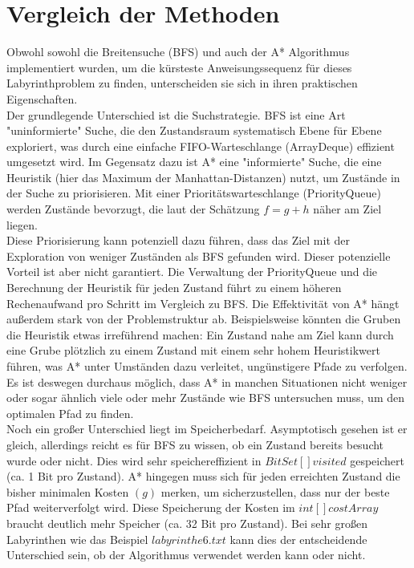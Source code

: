 \documentclass[a4paper,10pt,ngerman]{scrartcl}
\begin{document}
\section{Vergleich der Methoden}
Obwohl sowohl die Breitensuche (BFS) und auch der A* Algorithmus implementiert wurden, um die kürsteste Anweisungssequenz für dieses Labyrinthproblem zu finden, unterscheiden sie sich in ihren praktischen Eigenschaften.\\
Der grundlegende Unterschied ist die Suchstrategie. BFS ist eine Art "uninformierte" Suche, die den Zustandsraum systematisch Ebene für Ebene exploriert, was durch eine einfache FIFO-Warteschlange (ArrayDeque) effizient umgesetzt wird. Im Gegensatz dazu ist A* eine "informierte" Suche, die eine Heuristik (hier das Maximum der Manhattan-Distanzen) nutzt, um Zustände in der Suche zu priorisieren. Mit einer Prioritätswarteschlange (PriorityQueue) werden Zustände bevorzugt, die laut der Schätzung $f = g + h$ näher am Ziel liegen. \\
Diese Priorisierung kann potenziell dazu führen, dass das Ziel mit der Exploration von weniger Zuständen als BFS gefunden wird. Dieser potenzielle Vorteil ist aber nicht garantiert. Die Verwaltung der Priority\-Queue und die Berechnung der Heuristik für jeden Zustand führt zu einem höheren Rechenaufwand pro Schritt im Vergleich zu BFS. Die Effektivität von A* hängt außerdem stark von der Problemstruktur ab. Beispielsweise könnten die Gruben die Heuristik etwas irreführend machen: Ein Zustand nahe am Ziel kann durch eine Grube plötzlich zu einem Zustand mit einem sehr hohem Heuristikwert führen, was A* unter Umständen dazu verleitet, ungünstigere Pfade zu verfolgen. Es ist deswegen durchaus möglich, dass A* in manchen Situationen nicht weniger oder sogar ähnlich viele oder mehr Zustände wie BFS untersuchen muss, um den optimalen Pfad zu finden.\\
Noch ein großer Unterschied liegt im Speicherbedarf. Asymptotisch gesehen ist er gleich, allerdings reicht es für BFS zu wissen, ob ein Zustand bereits besucht wurde oder nicht. Dies wird sehr speichereffizient in $BitSet[] visited$ gespeichert (ca. 1 Bit pro Zustand). A* hingegen muss sich für jeden erreichten Zustand die bisher minimalen Kosten $(g)$ merken, um sicherzustellen, dass nur der beste Pfad weiterverfolgt wird. Diese Speicherung der Kosten im $int[] costArray$ braucht deutlich mehr Speicher (ca. 32 Bit pro Zustand). Bei sehr großen Labyrinthen wie das Beispiel $labyrinthe6.txt$ kann dies der entscheidende Unterschied sein, ob der Algorithmus verwendet werden kann oder nicht.\\
\end{document}
